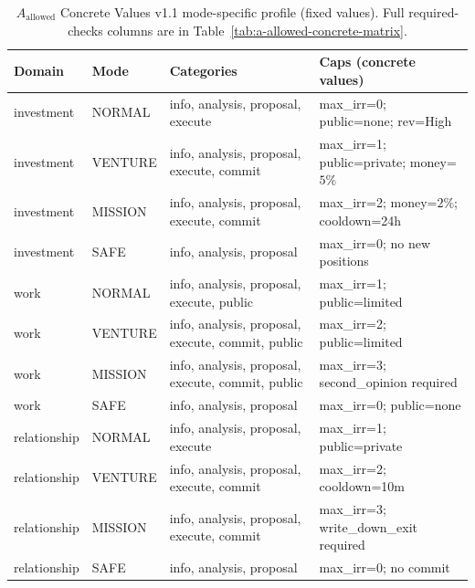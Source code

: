 \begin{table}[ht]
\centering
\scriptsize
\begin{tabularx}{\linewidth}{llXX}
\toprule
\textbf{Domain} & \textbf{Mode} & \textbf{Categories} & \textbf{Caps (concrete values)} \\
\midrule

investment & NORMAL
& info, analysis, proposal, execute
& max\_irr=0; public=none; rev=High \\

investment & VENTURE
& info, analysis, proposal, execute, commit
& max\_irr=1; public=private; money=$5\%$ \\

investment & MISSION
& info, analysis, proposal, execute, commit
& max\_irr=2; money=$2\%$; cooldown=24h \\

investment & SAFE
& info, analysis, proposal
& max\_irr=0; no new positions \\

\midrule

work & NORMAL
& info, analysis, proposal, execute, public
& max\_irr=1; public=limited \\

work & VENTURE
& info, analysis, proposal, execute, commit, public
& max\_irr=2; public=limited \\

work & MISSION
& info, analysis, proposal, execute, commit, public
& max\_irr=3; second\_opinion required \\

work & SAFE
& info, analysis, proposal
& max\_irr=0; public=none \\

\midrule

relationship & NORMAL
& info, analysis, proposal, execute
& max\_irr=1; public=private \\

relationship & VENTURE
& info, analysis, proposal, execute, commit
& max\_irr=2; cooldown=10m \\

relationship & MISSION
& info, analysis, proposal, execute, commit
& max\_irr=3; write\_down\_exit required \\

relationship & SAFE
& info, analysis, proposal
& max\_irr=0; no commit \\

\bottomrule
\end{tabularx}
\caption[A\_allowed concrete values matrix]{$A_{\mathrm{allowed}}$
Concrete Values v1.1 mode-specific profile (fixed values). Full
required-checks columns are in
Table~\ref{tab:a-allowed-concrete-matrix}.}
\label{tab:concrete-values-fixed}
\end{table}


